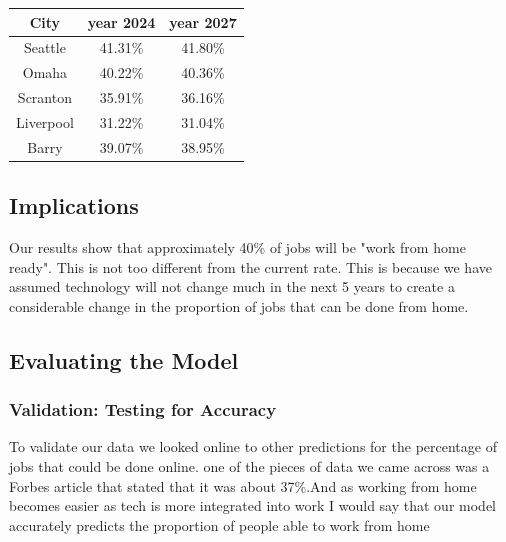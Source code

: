             
            
                 \begin{tabular}{|c|c|c|} %
                      \toprule 
                       \textbf{City} & \textbf{year 2024}  & \textbf{year 2027} \\
                      \midrule 
                       Seattle & 41.31\% & 41.80\% \\
                       Omaha & 40.22\% & 40.36\% \\
                       Scranton & 35.91\% & 36.16\% \\
                       Liverpool & 31.22\% & 31.04\% \\
                       Barry & 39.07\% & 38.95\% \\
                       
                       
                       

                      \bottomrule 
                    \end{tabular}
                           
            
        \subsection{Implications}
            Our results show that approximately 40\% of jobs will be "work from home ready". This is not too different from the current rate. This is because we have assumed technology will not change much in the next 5 years to create a considerable change in the proportion of jobs that can be done from home.
            
        \subsection{Evaluating the Model}
            \subsubsection{Validation: Testing for Accuracy}
                To validate our data we looked online to other predictions for the percentage of jobs that could be done online. one of the pieces of data we came across was a Forbes article \cite{Forbes} that stated that it was about 37\%.And as working from home becomes easier as tech is more integrated into work I would say that our model accurately predicts the proportion of people able to work from home
                

